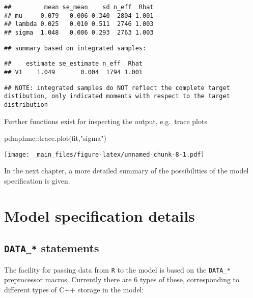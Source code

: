 \documentclass[
]{book}
\newenvironment{Shaded}{\begin{snugshade}}{\end{snugshade}}
\newcommand{\FunctionTok}[1]{\textcolor[rgb]{0.00,0.00,0.00}{#1}}
\newcommand{\NormalTok}[1]{#1}
\newcommand{\SpecialCharTok}[1]{\textcolor[rgb]{0.00,0.00,0.00}{#1}}
\newcommand{\StringTok}[1]{\textcolor[rgb]{0.31,0.60,0.02}{#1}}
\begin{document}
\begin{verbatim}
##         mean se_mean    sd n_eff  Rhat
## mu     0.079   0.006 0.340  2804 1.001
## lambda 0.025   0.010 0.511  2746 1.003
## sigma  1.048   0.006 0.293  2763 1.003
\end{verbatim}

\begin{verbatim}
## summary based on integrated samples:
\end{verbatim}

\begin{verbatim}
##    estimate se_estimate n_eff  Rhat
## V1    1.049       0.004  1794 1.001
\end{verbatim}

\begin{verbatim}
## NOTE: integrated samples do NOT reflect the complete target distibution, only indicated moments with respect to the target distribution
\end{verbatim}

Further functions exist for inspecting the output, e.g.~trace plots

\begin{Shaded}
\begin{Highlighting}[]
\NormalTok{pdmphmc}\SpecialCharTok{::}\FunctionTok{trace.plot}\NormalTok{(fit,}\StringTok{"sigma"}\NormalTok{)}
\end{Highlighting}
\end{Shaded}

\texttt{[image: \_main\_files/figure-latex/unnamed-chunk-8-1.pdf]}

In the next chapter, a more detailed summary of the possibilities of the model specification is given.

\hypertarget{model-specification-details}{%
\chapter{Model specification details}\label{model-specification-details}}

\hypertarget{data_-statements}{%
\section{\texorpdfstring{\texttt{DATA\_*} statements}{DATA\_* statements}}\label{data_-statements}}

The facility for passing data from \texttt{R} to the model is based on the \texttt{DATA\_*} preprocessor macros. Currently there are 6 types of these, corresponding to different types of C++ storage in the model:
\end{document}
